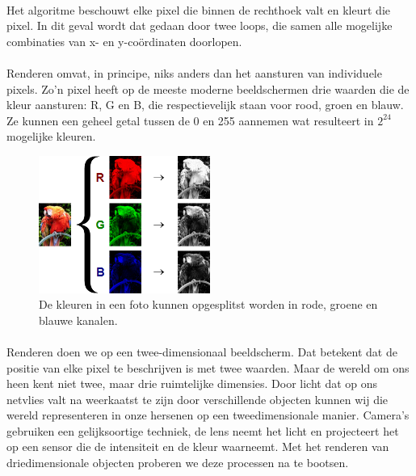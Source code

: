 \documentclass[12pt, a4paper]{article}
\begin{document}
\paragraph{}
Het algoritme beschouwt elke pixel die binnen de rechthoek valt en kleurt die pixel. In dit geval wordt dat gedaan door twee loops, die samen alle mogelijke combinaties van x- en y-coördinaten doorlopen. 

\paragraph{}
Renderen omvat, in principe, niks anders dan het aansturen van individuele pixels. Zo'n pixel heeft op de meeste moderne beeldschermen drie waarden die de kleur aansturen: R, G en B, die respectievelijk staan voor rood, groen en blauw. Ze kunnen een geheel getal tussen de 0 en 255 aannemen wat resulteert in \(2^{24}\) mogelijke kleuren.
\begin{figure}[h]
\centering
\includegraphics[width=0.5\textwidth]{RGB_channels_separation.png}
\caption{De kleuren in een foto kunnen opgesplitst worden in rode, groene en blauwe kanalen.}
\label{fig:rgb_separated}
\end{figure}

\paragraph{}
Renderen doen we op een twee-dimensionaal beeldscherm. Dat betekent dat de positie van elke pixel te beschrijven is met twee waarden. Maar de wereld om ons heen kent niet twee, maar drie ruimtelijke dimensies. Door licht dat op ons netvlies valt na weerkaatst te zijn door verschillende objecten kunnen wij die wereld representeren in onze hersenen op een tweedimensionale manier. Camera's gebruiken een gelijksoortige techniek, de lens neemt het licht en projecteert het op een sensor die de intensiteit en de kleur waarneemt. Met het renderen van driedimensionale objecten proberen we deze processen na te bootsen. 
\end{document}
